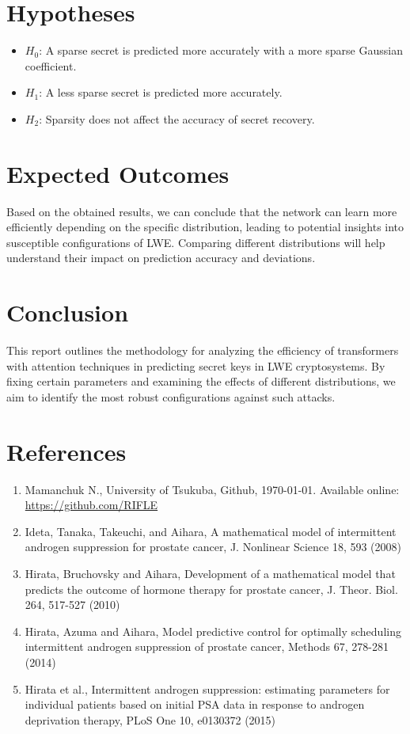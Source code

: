 \documentclass[12pt,a4paper]{article}
\begin{document}
\section{Hypotheses}
\begin{itemize}
    \item $H_0$: A sparse secret is predicted more accurately with a more sparse Gaussian coefficient.
    \item $H_1$: A less sparse secret is predicted more accurately.
    \item $H_2$: Sparsity does not affect the accuracy of secret recovery.
\end{itemize}

\section{Expected Outcomes}
Based on the obtained results, we can conclude that the network can learn more efficiently depending on the specific distribution, leading to potential insights into susceptible configurations of LWE. Comparing different distributions will help understand their impact on prediction accuracy and deviations.

\section{Conclusion}
This report outlines the methodology for analyzing the efficiency of transformers with attention techniques in predicting secret keys in LWE cryptosystems. By fixing certain parameters and examining the effects of different distributions, we aim to identify the most robust configurations against such attacks.

\section*{References}
\begin{enumerate}
    \item Mamanchuk N., University of Tsukuba, Github, \today. Available online: \url{https://github.com/RIFLE}
    \item Ideta, Tanaka, Takeuchi, and Aihara, A mathematical model of intermittent androgen suppression for prostate cancer, J. Nonlinear Science 18, 593 (2008)
    \item Hirata, Bruchovsky and Aihara, Development of a mathematical model that predicts the outcome of hormone therapy for prostate cancer, J. Theor. Biol. 264, 517-527 (2010)
    \item Hirata, Azuma and Aihara, Model predictive control for optimally scheduling intermittent androgen suppression of prostate cancer, Methods 67, 278-281 (2014)
    \item Hirata et al., Intermittent androgen suppression: estimating parameters for individual patients based on initial PSA data in response to androgen deprivation therapy, PLoS One 10, e0130372 (2015)
\end{enumerate}
\end{document}
